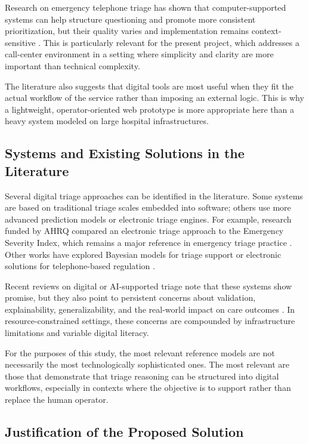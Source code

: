 \documentclass[a4paper,12pt,oneside]{report}
\begin{document}
Research on emergency telephone triage has shown that computer-supported systems can help structure questioning and promote more consistent prioritization, but their quality varies and implementation remains context-sensitive \cite{islam2021,alotaibi2021}. This is particularly relevant for the present project, which addresses a call-center environment in a setting where simplicity and clarity are more important than technical complexity.

The literature also suggests that digital tools are most useful when they fit the actual workflow of the service rather than imposing an external logic. This is why a lightweight, operator-oriented web prototype is more appropriate here than a heavy system modeled on large hospital infrastructures.

\subsection{Systems and Existing Solutions in the Literature}

Several digital triage approaches can be identified in the literature. Some systems are based on traditional triage scales embedded into software; others use more advanced prediction models or electronic triage engines. For example, research funded by AHRQ compared an electronic triage approach to the Emergency Severity Index, which remains a major reference in emergency triage practice \cite{hopscore}. Other works have explored Bayesian models for triage support or electronic solutions for telephone-based regulation \cite{sadeghi2006,hsiao2006}.

Recent reviews on digital or AI-supported triage note that these systems show promise, but they also point to persistent concerns about validation, explainability, generalizability, and the real-world impact on care outcomes \cite{digi_triage_2024,tyler2024}. In resource-constrained settings, these concerns are compounded by infrastructure limitations and variable digital literacy.

For the purposes of this study, the most relevant reference models are not necessarily the most technologically sophisticated ones. The most relevant are those that demonstrate that triage reasoning can be structured into digital workflows, especially in contexts where the objective is to support rather than replace the human operator.

\subsection{Justification of the Proposed Solution}
\end{document}
